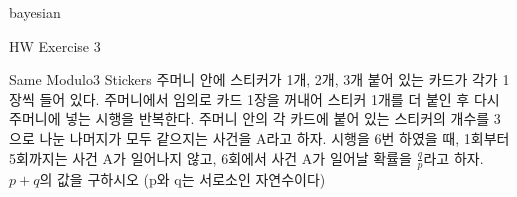 \begin{edXchapter}{bayesian}
\begin{edXsection}{HW Exercise 3}
\begin{edXvertical}
\begin{edXproblem}{Same Modulo3 Stickers}
주머니 안에 스티커가 1개, 2개, 3개 붙어 있는 카드가 각가 1장씩 들어 있다. 주머니에서 임의로
카드 1장을 꺼내어 스티커 1개를 더 붙인 후 다시 주머니에 넣는 시행을 반복한다. 주머니 안의
각 카드에 붙어 있는 스티커의 개수를 3으로 나눈 나머지가 모두 같으지는 사건을 A라고 하자.
시행을 6번 하였을 때, 1회부터 5회까지는 사건 A가 일어나지 않고, 6회에서 사건 A가 일어날 
확률을 $\frac{q}{p}$라고 하자. $p+q$의 값을 구하시오 (p와 q는 서로소인 자연수이다)
\end{edXproblem}

\end{edXvertical}
\end{edXsection}
\end{edXchapter}
